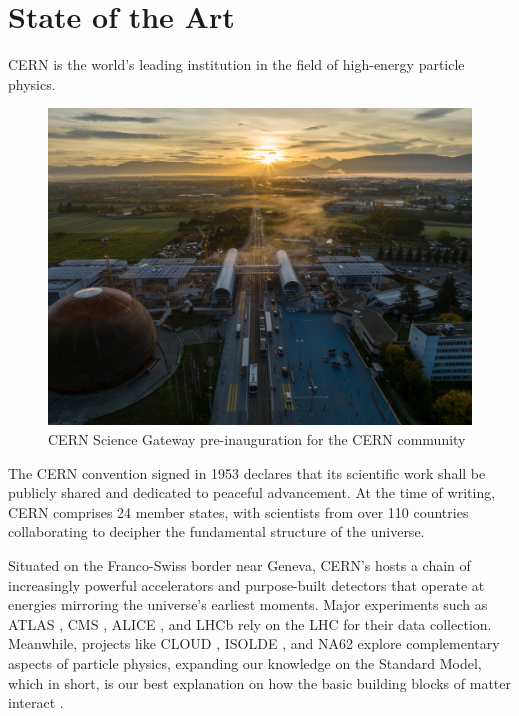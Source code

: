 \chapter{State of the Art}

\ac{CERN} \cite{cern-homepage} is the world's leading institution in the field of high-energy particle physics.

\begin{figure}[htbp]
\centering
\includegraphics[width=\textwidth]{images/introduction/cern.jpg}
\caption{CERN Science Gateway pre-inauguration for the \acs{CERN} community \protect\cite{cern_science_gateway}}
\label{fig:science-gateway}
\end{figure}

The \acf{CERN} convention \cite{cern-convention} signed in 1953 declares that its scientific work shall be publicly shared and dedicated to peaceful advancement. At the time of writing, \ac{CERN} comprises 24 member states, with scientists from over 110 countries collaborating to decipher the fundamental structure of the universe.

Situated on the Franco-Swiss border near Geneva, \ac{CERN}'s hosts a chain of increasingly powerful accelerators and purpose-built detectors that operate at energies mirroring the universe's earliest moments. Major experiments such as \acs{ATLAS} \cite{atlas-experiment}, \acs{CMS} \cite{cms-experiment}, \acs{ALICE} \cite{alice-experiment}, and \acs{LHCb} \cite{lhcb-experiment} rely on the \ac{LHC} \cite{Lebrun:1284331} for their data collection. Meanwhile, projects like \acs{CLOUD} \cite{Kirkby:1310801}, \acs{ISOLDE} \cite{isolde-facility}, and NA62 \cite{Martellotti:2056863} explore complementary aspects of particle physics, expanding our knowledge on the Standard Model, which in short, is our best explanation on how the basic building blocks of matter interact \cite{standard-model}.

